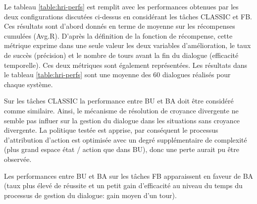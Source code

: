 \documentclass[a4paper,11pt,twoside]{StyleThese}
\begin{document}
Le tableau \ref{table:hri-perfs} est remplit avec les performances obtenues par les deux configurations discutées ci-dessus en considérant les tâches CLASSIC et FB. Ces résultats sont d'abord donnés en terme de moyenne sur les récompenses cumulées (Avg.R). D'après la définition de la fonction de récompense, cette métrique exprime dans une seule valeur les deux variables d'amélioration, le taux de succès (précision) et le nombre de tours avant la fin du dialogue (efficacité temporelle). Ces deux métriques sont également représentées. Les résultats dans le tableau \ref{table:hri-perfs} sont une moyenne des $60$ dialogues réalisés pour chaque système.



Sur les tâches CLASSIC la performance entre BU et BA doit être considéré comme similaire. Ainsi, le mécanisme de résolution de croyance divergente ne semble pas influer sur la gestion du dialogue dans les situations sans croyance divergente.  La politique testée est apprise, par conséquent le processus d'attribution d'action est optimisée avec un degré supplémentaire de complexité (plus grand espace état / action que dans BU), donc une perte aurait pu être observée.

Les performances entre BU et BA sur les tâches FB apparaissent en faveur de BA (taux plus élevé de réussite et un petit gain d'efficacité au niveau du temps  du processus de gestion du dialogue: gain moyen d'un tour).
%

\end{document}
